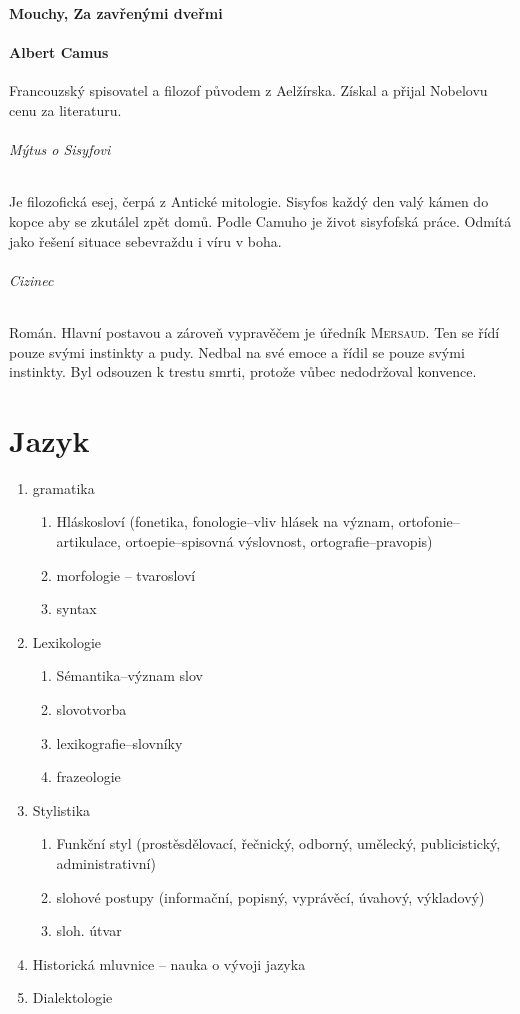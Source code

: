 \documentclass[10pt,a4page,headings,openany,%
oneside
,twocolumn
]{report}
\begin{document}
\textbf{Mouchy, Za zavřenými dveřmi}

\subsection{Albert Camus}Francouzský spisovatel a filozof původem z Aelžírska. Získal a přijal Nobelovu cenu za literaturu.

\paragraph{Mýtus o Sisyfovi} Je filozofická esej, čerpá z Antické mitologie. Sisyfos každý den valý kámen do kopce aby se zkutálel zpět domů. Podle Camuho je život sisyfofská práce. Odmítá jako řešení situace sebevraždu i víru v boha.

\paragraph{Cizinec} Román. Hlavní postavou a zároveň vypravěčem je úředník \textsc{Mersaud}. Ten se řídí pouze svými instinkty a pudy. Nedbal na své emoce a řídil se pouze svými instinkty. Byl odsouzen k trestu smrti, protože vůbec nedodržoval konvence.

\part{Jazyk}

\begin{enumerate}
\item gramatika
\begin{enumerate}
\item Hláskosloví (fonetika, fonologie--vliv hlásek na význam, ortofonie--artikulace, ortoepie--spisovná výslovnost, ortografie--pravopis)
\item morfologie -- tvarosloví
\item syntax
\end{enumerate}
\item Lexikologie
\begin{enumerate}
\item Sémantika--význam slov
\item slovotvorba
\item lexikografie--slovníky
\item frazeologie
\end{enumerate}
\item Stylistika
\begin{enumerate}
\item Funkční styl (prostěsdělovací, řečnický, odborný, umělecký, publicistický, administrativní) 
\item slohové postupy (informační, popisný, vyprávěcí, úvahový, výkladový)
\item sloh. útvar
\end{enumerate}
\item Historická mluvnice -- nauka o vývoji jazyka
\item Dialektologie
\end{enumerate}
\end{document}
